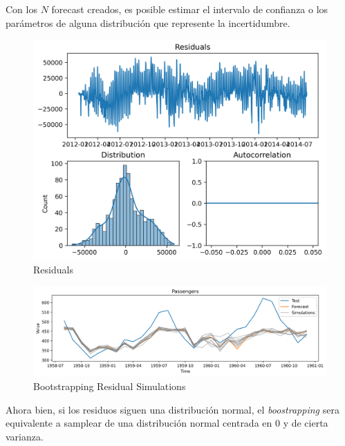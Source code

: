 Con los $N$ forecast creados, es posible estimar el intervalo de confianza o los parámetros de alguna distribución que represente la incertidumbre.

\begin{figure}[H]
    \center
    \includegraphics[scale=0.6]{notebooks/TS/img/residuals.png}
    \caption{Residuals}
\end{figure}

\begin{figure}[H]
    \center
    \includegraphics[scale=0.5]{notebooks/TS/img/residual_bootstrapping_simulations.png}
    \caption{Bootstrapping Residual Simulations}
\end{figure}

Ahora bien, si los residuos siguen una distribución normal, el \textit{boostrapping} sera equivalente a samplear de una distribución normal centrada en 0 y de cierta varianza.

